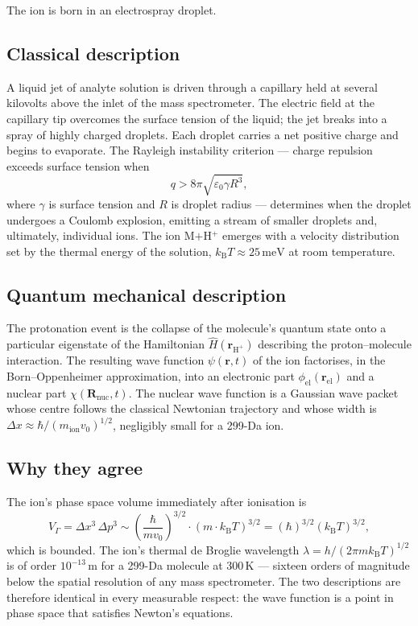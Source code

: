The ion is born in an electrospray droplet.

\subsection*{Classical description}
A liquid jet of analyte solution is driven through a capillary held at several
kilovolts above the inlet of the mass spectrometer.
The electric field at the capillary tip overcomes the surface tension of the
liquid; the jet breaks into a spray of highly charged droplets.
Each droplet carries a net positive charge and begins to evaporate.
The Rayleigh instability criterion --- charge repulsion exceeds surface tension
when
\begin{equation}\label{eq:rayleigh}
  q > 8\pi \sqrt{\varepsilon_0 \gamma R^3},
\end{equation}
where $\gamma$ is surface tension and $R$ is droplet radius --- determines
when the droplet undergoes a Coulomb explosion, emitting a stream of smaller
droplets and, ultimately, individual ions.
The ion M$+$H$^+$ emerges with a velocity distribution set by the thermal
energy of the solution, $k_\mathrm{B} T \approx 25\,\mathrm{meV}$ at room
temperature.

\subsection*{Quantum mechanical description}
The protonation event is the collapse of the molecule's quantum state onto
a particular eigenstate of the Hamiltonian $\hat{H}(\mathbf{r}_\mathrm{H^+})$
describing the proton--molecule interaction.
The resulting wave function $\psi(\mathbf{r}, t)$ of the ion factorises,
in the Born--Oppenheimer approximation, into an electronic part
$\phi_\mathrm{el}(\mathbf{r}_\mathrm{el})$ and a nuclear part
$\chi(\mathbf{R}_\mathrm{nuc}, t)$.
The nuclear wave function is a Gaussian wave packet whose centre follows
the classical Newtonian trajectory and whose
width is $\Delta x \approx \hbar / (m_\mathrm{ion} v_0)^{1/2}$, negligibly
small for a 299-Da ion.

\subsection*{Why they agree}
The ion's phase space volume immediately after ionisation is
\begin{equation}
  V_\Gamma = \Delta x^3\, \Delta p^3 \sim \left(\frac{\hbar}{m v_0}\right)^{3/2}
             \cdot (m \cdot k_\mathrm{B}T)^{3/2} = (\hbar)^{3/2}(k_\mathrm{B}T)^{3/2},
\end{equation}
which is bounded.
The ion's thermal de Broglie wavelength $\lambda = h/(2\pi m k_\mathrm{B}T)^{1/2}$
is of order $10^{-13}\,\mathrm{m}$ for a 299-Da molecule at 300\,K ---
sixteen orders of magnitude below the spatial resolution of any mass
spectrometer.
The two descriptions are therefore identical in every measurable respect:
the wave function is a point in phase space that satisfies Newton's equations.

